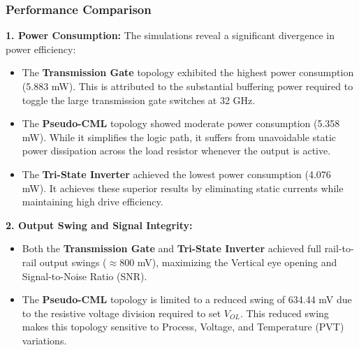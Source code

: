 \documentclass[12pt, a4paper]{report}
\begin{document}
\subsubsection{Performance Comparison}

\textbf{1. Power Consumption:}
The simulations reveal a significant divergence in power efficiency:
\begin{itemize}
    \item The \textbf{Transmission Gate} topology exhibited the highest power consumption (5.883 mW). This is attributed to the substantial buffering power required to toggle the large transmission gate switches at 32 GHz.
    \item The \textbf{Pseudo-CML} topology showed moderate power consumption (5.358 mW). While it simplifies the logic path, it suffers from unavoidable static power dissipation across the load resistor whenever the output is active.
    \item The \textbf{Tri-State Inverter} achieved the lowest power consumption (4.076 mW). It achieves these superior results by eliminating static currents while maintaining high drive efficiency.
\end{itemize}

\textbf{2. Output Swing and Signal Integrity:}
\begin{itemize}
    \item Both the \textbf{Transmission Gate} and \textbf{Tri-State Inverter} achieved full rail-to-rail output swings ($\approx 800$ mV), maximizing the Vertical eye opening and Signal-to-Noise Ratio (SNR).
    \item The \textbf{Pseudo-CML} topology is limited to a reduced swing of 634.44 mV due to the resistive voltage division required to set $V_{OL}$. This reduced swing makes this topology sensitive to Process, Voltage, and Temperature (PVT) variations.
\end{itemize}
\end{document}
